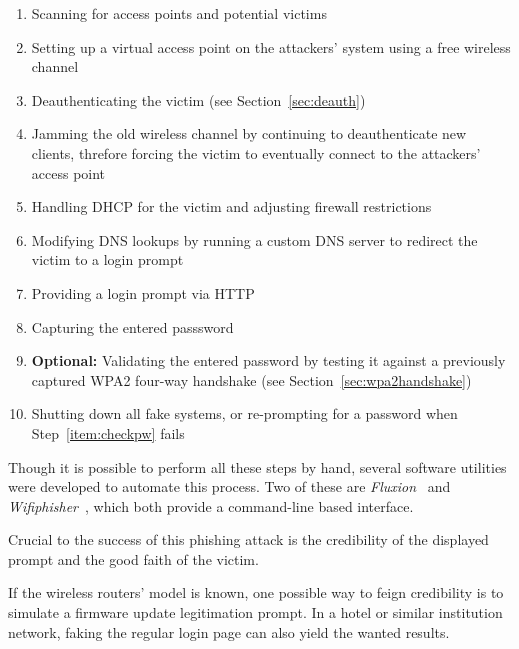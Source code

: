 \begin{enumerate}

\item{Scanning for access points and potential victims}

\item{Setting up a virtual access point on the attackers' system using a free wireless channel}

\item{Deauthenticating the victim (see Section~\ref{sec:deauth})}

\item{Jamming the old wireless channel by continuing to deauthenticate new clients, threfore forcing the victim to eventually connect to the attackers' access point}

\item{Handling DHCP for the victim and adjusting firewall restrictions}

\item{Modifying DNS lookups by running a custom DNS server to redirect the victim to a login prompt}

\item{Providing a login prompt via HTTP}

\item{Capturing the entered passsword}

\item{\textbf{Optional:} Validating the entered password by testing it against a previously captured WPA2 four-way handshake (see Section~\ref{sec:wpa2handshake})}\label{item:checkpw}

\item{Shutting down all fake systems, or re-prompting for a password when Step~\ref{item:checkpw} fails}

\end{enumerate}

Though it is possible to perform all these steps by hand, several software utilities were developed to automate this process. Two of these are \emph{Fluxion}~\cite{Fluxion17} and \emph{Wifiphisher}~\cite{Wifiphisher17}, which both provide a command-line based interface.

Crucial to the success of this phishing attack is the credibility of the displayed prompt and the good faith of the victim. 

If the wireless routers' model is known, one possible way to feign credibility is to simulate a firmware update legitimation prompt. In a hotel or similar institution network, faking the regular login page can also yield the wanted results.

